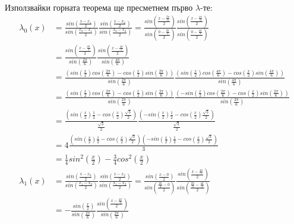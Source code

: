 \documentclass[12pt]{article}
\begin{document}
Използвайки горната теорема ще пресметнем първо $\lambda$-те:
\begin{align*}
\lambda_0(x)&=\frac{sin\left(\frac{x-x_1}{2}\right)}{sin\left(\frac{x_0-x_1}{2}\right)}\frac{sin\left(\frac{x-x_2}{2}\right)}{sin\left(\frac{x_0-x_2}{2}\right)} = \frac{sin\left(\frac{x-\frac{2\pi}{3}}{2}\right)}{sin\left(\frac{0-\frac{2\pi}{3}}{2}\right)}\frac{sin\left(\frac{x-\frac{4\pi}{3}}{2}\right)}{sin\left(\frac{0-\frac{4\pi}{3}}{2}\right)}\\
& = \frac{sin\left(\frac{x-\frac{2\pi}{3}}{2}\right)}{sin\left(\frac{2\pi}{6}\right)}\frac{sin\left(\frac{x-\frac{4\pi}{3}}{2}\right)}{sin\left(\frac{4\pi}{6}\right)}\\
&=\frac{\left(sin\left(\frac{x}{2}\right)cos\left(\frac{2\pi}{6}\right)-cos\left(\frac{x}{2}\right)sin\left(\frac{2\pi}{6}\right)\right)}{sin\left(\frac{2\pi}{6}\right)}
\frac{\left(sin\left(\frac{x}{2}\right)cos\left(\frac{4\pi}{6}\right)-cos\left(\frac{x}{2}\right)sin\left(\frac{4\pi}{6}\right)\right)}{sin\left(\frac{4\pi}{6}\right)}\\
&=\frac{\left(sin\left(\frac{x}{2}\right)cos\left(\frac{2\pi}{6}\right)-cos\left(\frac{x}{2}\right)sin\left(\frac{2\pi}{6}\right)\right)}{sin\left(\frac{2\pi}{6}\right)}
\frac{\left(-sin\left(\frac{x}{2}\right)cos\left(\frac{2\pi}{6}\right)-cos\left(\frac{x}{2}\right)sin\left(\frac{2\pi}{6}\right)\right)}{sin\left(\frac{2\pi}{6}\right)}\\
&=\frac{\left(sin\left(\frac{x}{2}\right)\frac{1}{2}-cos\left(\frac{x}{2}\right)\frac{\sqrt3}{2}\right)}{\frac{\sqrt3}{2}}
\frac{\left(-sin\left(\frac{x}{2}\right)\frac{1}{2}-cos\left(\frac{x}{2}\right)\frac{\sqrt3}{2}\right)}{\frac{\sqrt3}{2}}\\
&=4\frac{\left(sin\left(\frac{x}{2}\right)\frac{1}{2}-cos\left(\frac{x}{2}\right)\frac{\sqrt3}{2}\right)
\left(-sin\left(\frac{x}{2}\right)\frac{1}{2}-cos\left(\frac{x}{2}\right)\frac{\sqrt3}{2}\right)}{3}\\
&=\frac{1}{4}sin^2\left(\frac{x}{2}\right)-\frac{3}{4}cos^2\left(\frac{x}{2}\right)\\
\lambda_1(x)&=\frac{sin\left(\frac{x-x_0}{2}\right)}{sin\left(\frac{x_1-x_0}{2}\right)}\frac{sin\left(\frac{x-x_2}{2}\right)}{sin\left(\frac{x_1-x_2}{2}\right)} = \frac{sin\left(\frac{x-0}{2}\right)}{sin\left(\frac{\frac{2\pi}{3}-0}{2}\right)}\frac{sin\left(\frac{x-\frac{4\pi}{3}}{2}\right)}{sin\left(\frac{\frac{2\pi}{3}-\frac{4\pi}{3}}{2}\right)}\\
&=-\frac{sin\left(\frac{x}{2}\right)}{sin\left(\frac{2\pi}{6}\right)}\frac{sin\left(\frac{x-\frac{4\pi}{3}}{2}\right)}{sin\left(\frac{2\pi}{6}\right)}\\

\end{align*}
\end{document}
